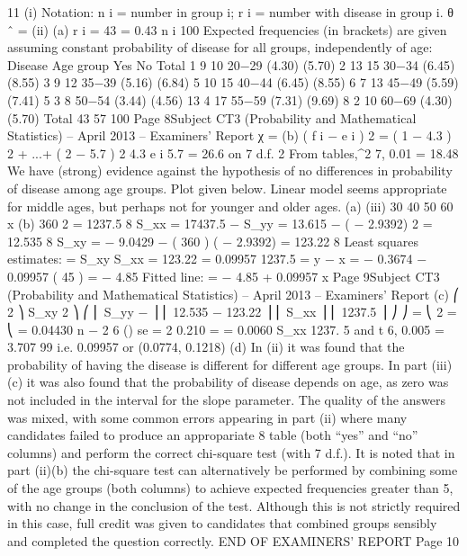 \documentclass[a4paper,12pt]{article}
\begin{document}
\newpage
11
(i)
Notation: n i = number in group i; r i = number with disease in group i.
θ ˆ =
(ii)
(a)
\sum r i = 43 = 0.43
\sum n i 100
Expected frequencies (in brackets) are given assuming constant
probability of disease for all groups, independently of age:
Disease
Age group Yes
No
Total
1
9
10
20−29
(4.30) (5.70)
2
13
15
30−34
(6.45) (8.55)
3
9
12
35−39
(5.16) (6.84)
5
10
15
40−44
(6.45) (8.55)
6
7
13
45−49
(5.59) (7.41)
5
3
8
50−54
(3.44) (4.56)
13
4
17
55−59
(7.31) (9.69)
8
2
10
60−69
(4.30) (5.70)
Total
43
57
100
Page 8Subject CT3 (Probability and Mathematical Statistics) – April 2013 – Examiners’ Report
χ = 
(b)
( f i − e i ) 2 = ( 1 − 4.3 ) 2 + ...+ ( 2 − 5.7 ) 2
4.3
e i
5.7
= 26.6 on 7 d.f.
2
From tables,\chi^2 7,
0.01 = 18.48
We have (strong) evidence against the hypothesis of no differences in
probability of disease among age groups.
Plot given below. Linear model seems appropriate for middle ages,
but perhaps not for younger and older ages.
(a)
(iii)
30
40
50
60
x
(b)
360 2
= 1237.5
8
S_{xx} = 17437.5 −
S_{yy} = 13.615 −
( − 2.9392) 2
= 12.535
8
S_{xy} = − 9.0429 −
( 360 ) ( − 2.9392) = 123.22
8
Least squares estimates:
\hat{\beta} =
S_{xy}
S_{xx}
=
123.22
= 0.09957
1237.5
\hat{\alpha}= y − \hat{\beta} x = − 0.3674 − 0.09957 ( 45 ) = − 4.85
Fitted line:  = − 4.85 + 0.09957 x
Page 9Subject CT3 (Probability and Mathematical Statistics) – April 2013 – Examiners’ Report
(c)
⎛
2 ⎞
S_{xy} 2 ⎞ ⎛
⎜ S_{yy} −
⎟ ⎜ 12.535 − 123.22 ⎟
⎜
S_{xx} ⎟ ⎜
1237.5 ⎟ ⎠
⎠ = ⎝
\hat{\sigma} 2 = ⎝
= 0.04430
n − 2
6
()
se \hat{\beta} =
\hat{\sigma} 2
0.210
=
= 0.0060
S_{xx}
1237. 5
and t 6, 0.005 = 3.707
99%
i.e. 0.09957  or (0.0774, 0.1218)
(d)
In (ii) it was found that the probability of having the disease is
different for different age groups. In part (iii)(c) it was also found that
the probability of disease depends on age, as zero was not included in
the interval for the slope parameter.
The quality of the answers was mixed, with some common errors appearing in part (ii)
where many candidates failed to produce an appropariate 8 \; \times {} table (both “yes” and “no”
columns) and perform the correct chi-square test (with 7 d.f.).
It is noted that in part (ii)(b) the chi-square test can alternatively be performed by combining
some of the age groups (both columns) to achieve expected frequencies greater than 5, with
no change in the conclusion of the test. Although this is not strictly required in this case, full
credit was given to candidates that combined groups sensibly and completed the question
correctly.
END OF EXAMINERS’ REPORT
Page 10
\end{document}
